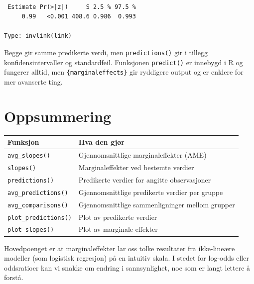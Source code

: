 \documentclass[
  norsk,
  letterpaper,
  DIV=11,
  numbers=noendperiod]{scrreprt}
\theoremstyle{definition}
\theoremstyle{remark}
\begin{document}
\begin{verbatim}

 Estimate Pr(>|z|)     S 2.5 % 97.5 %
     0.99   <0.001 408.6 0.986  0.993

Type: invlink(link)
\end{verbatim}

Begge gir samme predikerte verdi, men \texttt{predictions()} gir i
tillegg konfidensintervaller og standardfeil. Funksjonen
\texttt{predict()} er innebygd i R og fungerer alltid, men
\texttt{\{marginaleffects\}} gir ryddigere output og er enklere for mer
avanserte ting.

\section{Oppsummering}\label{oppsummering-5}

\begin{longtable}[]{@{}
  >{\raggedright\arraybackslash}p{}
  >{\raggedright\arraybackslash}p{}@{}}
\toprule\noalign{}
\begin{minipage}[b]{\linewidth}\raggedright
Funksjon
\end{minipage} & \begin{minipage}[b]{\linewidth}\raggedright
Hva den gjør
\end{minipage} \\
\midrule\noalign{}
\endhead
\bottomrule\noalign{}
\endlastfoot
\texttt{avg\_slopes()} & Gjennomsnittlige marginaleffekter (AME) \\
\texttt{slopes()} & Marginaleffekter ved bestemte verdier \\
\texttt{predictions()} & Predikerte verdier for angitte observasjoner \\
\texttt{avg\_predictions()} & Gjennomsnittlige predikerte verdier per
gruppe \\
\texttt{avg\_comparisons()} & Gjennomsnittlige sammenligninger mellom
grupper \\
\texttt{plot\_predictions()} & Plot av predikerte verdier \\
\texttt{plot\_slopes()} & Plot av marginale effekter \\
\end{longtable}

Hovedpoenget er at marginaleffekter lar oss tolke resultater fra
ikke-lineære modeller (som logistisk regresjon) på en intuitiv skala. I
stedet for log-odds eller oddsratioer kan vi snakke om endring i
sannsynlighet, noe som er langt lettere å forstå.
\end{document}
